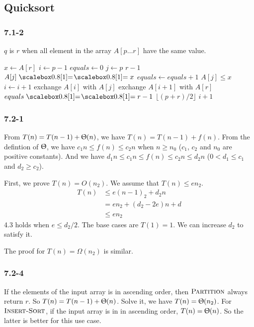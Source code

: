 \documentclass{book}
\begin{document}
\begin{CJK}{UTF8}{gkai}
\chapter{Quicksort}
\subsection*{7.1-2} $q$ is $r$ when all element in the array $A[p\dots r]$ have the 
same value.
\begin{codebox}
\li $x \gets A[r]$
\li $i \gets p-1$
\li $equals \gets 0$
\li \For $j \gets p$ \To $r-1$
\li \Do \If $A[j] \isequal x$
\li \Then $equals \gets equals+1$
\End
\li \If $A[j] \le x$
\li \Then $i \gets i+1$
\li exchange $A[i]$ with $A[j]$
\End
\End
\li exchange $A[i+1]$ with $A[r]$
\li \If $equals \isequal r-1$
\li \Then \Return $\lfloor (p+r)/2 \rfloor$
\li \Else \Return $i+1$
\End
\end{codebox}

\subsection*{7.2-1} From $T(n) = T(n-1) + \Uptheta(n)$, we have $T(n) = T(n-1) + 
f(n)$. From the defintion of $\Uptheta$, we have $c_1 n \le f(n) \le c_2 n$ when 
$n \ge n_0$ ($c_1$, $c_2$ and $n_0$ are positive constants). And we have $d_1 n 
\le c_1 n \le f(n) \le c_2 n \le d_2 n$ ($0 < d_1 \le c_1$ and $d_2 \ge c_2$). 

First, we prove $T(n) = O(n_2)$. We assume that $T(n) \le e n_2$.
\begin{align}
T(n) & \le e(n-1)_2 + d_2 n \\
& = en_2 + (d_2-2e)n + d \\
& \le en_2
\end{align}
4.3 holds when $e \le d_2/2$. The base cases are $T(1) = 1$. We can increase 
  $d_2$ to satisfy it.

The proof for $T(n) = \Omega(n_2)$ is similar.

\subsection*{7.2-4} If the elements of the input array is in ascending order, then 
$\textnormal{\scshape Partition}$ always return $r$. So $T(n) = T(n-1) + \Uptheta(n)$. Solve 
it, we have $T(n) = \Uptheta(n_2)$. For $\textnormal{\scshape Insert-Sort}$, if the input array 
is in in ascending order, $T(n) = \Uptheta(n)$. So the latter is better for this 
use case.


\end{CJK}
\end{document}
